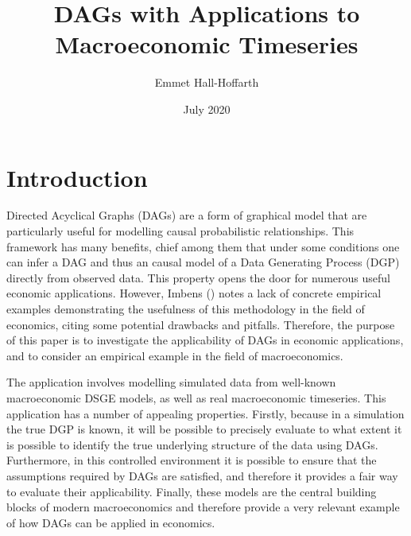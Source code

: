 \documentclass{article}
\title{DAGs with Applications to Macroeconomic Timeseries}
\author{Emmet Hall-Hoffarth}
\date{July 2020}
\begin{document}
\maketitle


\section{Introduction}

Directed Acyclical Graphs (DAGs) \parencite{pearl1995causal} are a form of graphical model that are particularly useful for modelling causal probabilistic relationships. This framework has many benefits, chief among them that under some conditions one can infer a DAG and thus an causal model of a Data Generating Process (DGP) directly from observed data. This property opens the door for numerous useful economic applications. However, Imbens (\citeyear{imbens2019potential}) notes a lack of concrete empirical examples demonstrating the usefulness of this methodology in the field of economics, citing some potential drawbacks and pitfalls. Therefore, the purpose of this paper is to investigate the applicability of DAGs in economic applications, and to consider an empirical example in the field of macroeconomics. 

The application involves modelling simulated data from well-known macroeconomic DSGE models, as well as real macroeconomic timeseries. This application has a number of appealing properties. Firstly, because in a simulation the true DGP is known, it will be possible to precisely evaluate to what extent it is possible to identify the true underlying structure of the data using DAGs. Furthermore, in this controlled environment it is possible to ensure that the assumptions required by DAGs are satisfied, and therefore it provides a fair way to evaluate their applicability. Finally, these models are the central building blocks of modern macroeconomics and therefore provide a very relevant example of how DAGs can be applied in economics.
\end{document}
